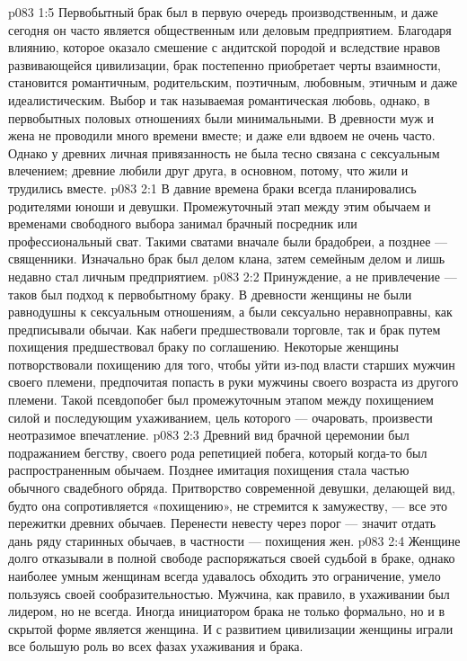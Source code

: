 \vs p083 1:5 Первобытный брак был в первую очередь производственным, и даже сегодня он часто является общественным или деловым предприятием. Благодаря влиянию, которое оказало смешение с андитской породой и вследствие нравов развивающейся цивилизации, брак постепенно приобретает черты взаимности, становится романтичным, родительским, поэтичным, любовным, этичным и даже идеалистическим. Выбор и так называемая романтическая любовь, однако, в первобытных половых отношениях были минимальными. В древности муж и жена не проводили много времени вместе; и даже ели вдвоем не очень часто. Однако у древних личная привязанность не была тесно связана с сексуальным влечением; древние любили друг друга, в основном, потому, что жили и трудились вместе.
\vs p083 2:1 В давние времена браки всегда планировались родителями юноши и девушки. Промежуточный этап между этим обычаем и временами свободного выбора занимал брачный посредник или профессиональный сват. Такими сватами вначале были брадобреи, а позднее --- священники. Изначально брак был делом клана, затем семейным делом и лишь недавно стал личным предприятием.
\vs p083 2:2 Принуждение, а не привлечение --- таков был подход к первобытному браку. В древности женщины не были равнодушны к сексуальным отношениям, а были сексуально неравноправны, как предписывали обычаи. Как набеги предшествовали торговле, так и брак путем похищения предшествовал браку по соглашению. Некоторые женщины потворствовали похищению для того, чтобы уйти из\hyp{}под власти старших мужчин своего племени, предпочитая попасть в руки мужчины своего возраста из другого племени. Такой псевдопобег был промежуточным этапом между похищением силой и последующим ухаживанием, цель которого --- очаровать, произвести неотразимое впечатление.
\vs p083 2:3 Древний вид брачной церемонии был подражанием бегству, своего рода репетицией побега, который когда\hyp{}то был распространенным обычаем. Позднее имитация похищения стала частью обычного свадебного обряда. Притворство современной девушки, делающей вид, будто она сопротивляется «похищению», не стремится к замужеству, --- все это пережитки древних обычаев. Перенести невесту через порог --- значит отдать дань ряду старинных обычаев, в частности --- похищения жен.
\vs p083 2:4 Женщине долго отказывали в полной свободе распоряжаться своей судьбой в браке, однако наиболее умным женщинам всегда удавалось обходить это ограничение, умело пользуясь своей сообразительностью. Мужчина, как правило, в ухаживании был лидером, но не всегда. Иногда инициатором брака не только формально, но и в скрытой форме является женщина. И с развитием цивилизации женщины играли все большую роль во всех фазах ухаживания и брака.
